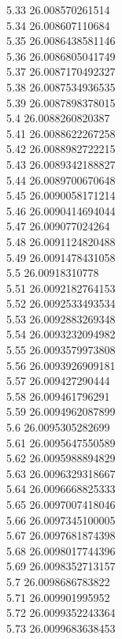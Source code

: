 {5.33	26.008570261514\\
5.34	26.008607110684\\
5.35	26.0086438581146\\
5.36	26.0086805041749\\
5.37	26.0087170492327\\
5.38	26.0087534936535\\
5.39	26.0087898378015\\
5.4	26.0088260820387\\
5.41	26.0088622267258\\
5.42	26.0088982722215\\
5.43	26.0089342188827\\
5.44	26.0089700670648\\
5.45	26.0090058171214\\
5.46	26.0090414694044\\
5.47	26.009077024264\\
5.48	26.0091124820488\\
5.49	26.0091478431058\\
5.5	26.00918310778\\
5.51	26.0092182764153\\
5.52	26.0092533493534\\
5.53	26.0092883269348\\
5.54	26.0093232094982\\
5.55	26.0093579973808\\
5.56	26.0093926909181\\
5.57	26.009427290444\\
5.58	26.009461796291\\
5.59	26.0094962087899\\
5.6	26.0095305282699\\
5.61	26.0095647550589\\
5.62	26.0095988894829\\
5.63	26.0096329318667\\
5.64	26.0096668825333\\
5.65	26.0097007418046\\
5.66	26.0097345100005\\
5.67	26.0097681874398\\
5.68	26.0098017744396\\
5.69	26.0098352713157\\
5.7	26.0098686783822\\
5.71	26.009901995952\\
5.72	26.0099352243364\\
5.73	26.0099683638453\\
}
